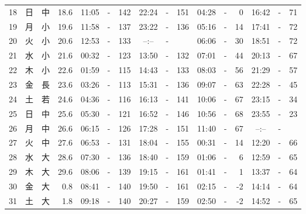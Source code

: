 \documentclass[12pt.a4j]{jsarticle}
\begin{document}
\begin{center}
\begin{table}[ht]
\begin{tabular}{|rc|cr|ccrccr|ccrccr|}
18 & 日 & 中 & 18.6 &  11:05 &-& 142  &  22:24 &-& 151  &   04:28 &-&   0  &   16:42 &-&  71  \\
19 & 月 & 小 & 19.6 &  11:58 &-& 137  &  23:22 &-& 136  &   05:16 &-&  14  &   17:41 &-&  72  \\
20 & 火 & 小 & 20.6 &  12:53 &-& 133  &  --:-- &-&     &   06:06 &-&  30  &   18:51 &-&  72  \\
21 & 水 & 小 & 21.6 &  00:32 &-& 123  &  13:50 &-& 132  &   07:01 &-&  44  &   20:13 &-&  67  \\
22 & 木 & 小 & 22.6 &  01:59 &-& 115  &  14:43 &-& 133  &   08:03 &-&  56  &   21:29 &-&  57  \\
23 & 金 & 長 & 23.6 &  03:26 &-& 113  &  15:31 &-& 136  &   09:07 &-&  63  &   22:28 &-&  45  \\
24 & 土 & 若 & 24.6 &  04:36 &-& 116  &  16:13 &-& 141  &   10:06 &-&  67  &   23:15 &-&  34  \\
25 & 日 & 中 & 25.6 &  05:30 &-& 121  &  16:52 &-& 146  &   10:56 &-&  68  &   23:55 &-&  23  \\
26 & 月 & 中 & 26.6 &  06:15 &-& 126  &  17:28 &-& 151  &   11:40 &-&  67  &   --:-- &-&     \\
27 & 火 & 中 & 27.6 &  06:53 &-& 131  &  18:04 &-& 155  &   00:31 &-&  14  &   12:20 &-&  66  \\
28 & 水 & 大 & 28.6 &  07:30 &-& 136  &  18:40 &-& 159  &   01:06 &-&   6  &   12:59 &-&  65  \\
29 & 木 & 大 & 29.6 &  08:06 &-& 139  &  19:15 &-& 161  &   01:41 &-&   1  &   13:37 &-&  64  \\
30 & 金 & 大 &  0.8 &  08:41 &-& 140  &  19:50 &-& 161  &   02:15 &-&  -2  &   14:14 &-&  64  \\
31 & 土 & 大 &  1.8 &  09:18 &-& 140  &  20:27 &-& 159  &   02:50 &-&  -2  &   14:52 &-&  65  \\
   \hline
   \end{tabular}
\end{table}
\newpage
\end{center}
\end{document}

